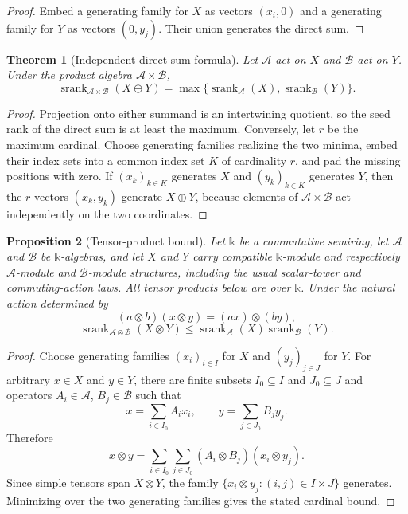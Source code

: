 \documentclass[11pt]{article}
\newtheorem{theorem}{Theorem}[section]
\newtheorem{proposition}[theorem]{Proposition}
\theoremstyle{definition}
\theoremstyle{remark}
\newcommand{\cA}{\mathcal A}
\newcommand{\cB}{\mathcal B}
\newcommand{\srank}{\operatorname{srank}}
\newcommand{\bbk}{\mathbb{k}}
\begin{document}
\begin{proof}
Embed a generating family for $X$ as vectors $(x_i,0)$ and a generating family for $Y$ as vectors $(0,y_j)$. Their union generates the direct sum.
\end{proof}

\begin{theorem}[Independent direct-sum formula]
\label{thm:independent-direct-sum}
Let $\cA$ act on $X$ and $\cB$ act on $Y$. Under the product algebra $\cA\times\cB$,
\[
{
\srank_{\cA\times\cB}(X\oplus Y)
=
\max\{\srank_{\cA}(X),\srank_{\cB}(Y)\}.
}
\]
\end{theorem}

\begin{proof}
Projection onto either summand is an intertwining quotient, so the seed rank of the direct sum is at least the maximum. Conversely, let $r$ be the maximum cardinal. Choose generating families realizing the two minima, embed their index sets into a common index set $K$ of cardinality $r$, and pad the missing positions with zero. If $(x_k)_{k\in K}$ generates $X$ and $(y_k)_{k\in K}$ generates $Y$, then the $r$ vectors $(x_k,y_k)$ generate $X\oplus Y$, because elements of $\cA\times\cB$ act independently on the two coordinates.
\end{proof}

\begin{proposition}[Tensor-product bound]
\label{prop:tensor-product-bound}
Let $\bbk$ be a commutative semiring, let $\cA$ and $\cB$ be $\bbk$-algebras, and let $X$ and $Y$ carry compatible $\bbk$-module and respectively $\cA$-module and $\cB$-module structures, including the usual scalar-tower and commuting-action laws. All tensor products below are over $\bbk$. Under the natural action determined by
\[
(a\otimes b)(x\otimes y)=(ax)\otimes(by),
\]
\[
{
\srank_{\cA\otimes\cB}(X\otimes Y)
\le
\srank_{\cA}(X)\srank_{\cB}(Y).
}
\]
\end{proposition}

\begin{proof}
Choose generating families $(x_i)_{i\in I}$ for $X$ and $(y_j)_{j\in J}$ for $Y$. For arbitrary $x\in X$ and $y\in Y$, there are finite subsets $I_0\subseteq I$ and $J_0\subseteq J$ and operators $A_i\in\cA$, $B_j\in\cB$ such that
\[
x=\sum_{i\in I_0}A_ix_i,
\qquad
y=\sum_{j\in J_0}B_jy_j.
\]
Therefore
\[
x\otimes y
=
\sum_{i\in I_0}\sum_{j\in J_0}
(A_i\otimes B_j)(x_i\otimes y_j).
\]
Since simple tensors span $X\otimes Y$, the family $\{x_i\otimes y_j:(i,j)\in I\times J\}$ generates. Minimizing over the two generating families gives the stated cardinal bound.
\end{proof}
\end{document}
